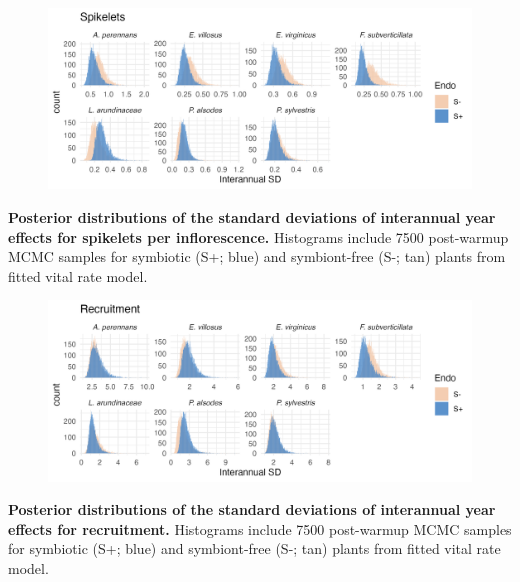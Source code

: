 \documentclass[12pt]{article}
\begin{document}
\begin{figure}[H]
	\centering
	\includegraphics[width=.9\linewidth]{spike_sigmayear_hist.png}
\end{figure}
 \textbf{Posterior distributions of the standard deviations of interannual year effects for spikelets per inflorescence.} Histograms include 7500 post-warmup MCMC samples for symbiotic (S+; blue) and symbiont-free (S-; tan) plants from fitted vital rate model.


\begin{figure}[H]
	\centering
	\includegraphics[width=.9\linewidth]{recruit_sigmayear_hist.png}
\end{figure}
 \textbf{Posterior distributions of the standard deviations of interannual year effects for recruitment.} Histograms include 7500 post-warmup MCMC samples for symbiotic (S+; blue) and symbiont-free (S-; tan) plants from fitted vital rate model.

\newpage
\end{document}
